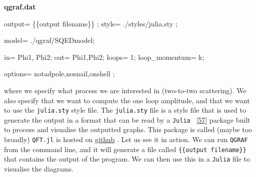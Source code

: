 \documentclass[
  10pt,
  a4paper,
  DIV=11,
  numbers=noendperiod,
  twoside]{scrreprt}
\newenvironment{Shaded}{\begin{snugshade}}{\end{snugshade}}
\newcommand{\NormalTok}[1]{\textcolor[rgb]{0.00,0.23,0.31}{#1}}
\DeclareRobustCommand{\[}{\begin{equation}}
\DeclareRobustCommand{\]}{\end{equation}}
\begin{document}
\textbf{qgraf.dat}

\begin{Shaded}
\begin{Highlighting}[]
\NormalTok{output= \textquotesingle{}\{\{output filename\}\}\textquotesingle{} ;}
\NormalTok{style= \textquotesingle{}./styles/julia.sty\textquotesingle{} ; }

\NormalTok{model= \textquotesingle{}./qgraf/SQEDmodel\textquotesingle{};}

\NormalTok{in= Phi1,  Phi2;}
\NormalTok{out= Phi1,Phi2;}
\NormalTok{loops= 1;}
\NormalTok{loop\_momentum= k;}

\NormalTok{options=  notadpole,nosnail,onshell ;}
\end{Highlighting}
\end{Shaded}

where we specify what process we are interested in (two-to-two
scattering). We also specify that we want to compute the one loop
amplitude, and that we want to use the \texttt{julia.sty} style file.
The \texttt{julia.sty} file is a style file that is used to generate the
output in a format that can be read by a \texttt{Julia}
~{[}\protect\hyperlink{ref-Bezanson:2015}{57}{]} package built to
process and visualise the outputted graphs. This package is called
(maybe too broadly) \texttt{QFT.jl} is hosted on
\href{https://github.com/lcnhb/QFT.jl}{github} . Let us see it in
action. We can run \texttt{QGRAF} from the command line, and it will
generate a file called \texttt{\{\{output\ filename\}\}} that contains
the output of the program. We can then use this in a \texttt{Julia} file
to visualise the diagrams.
\end{document}
